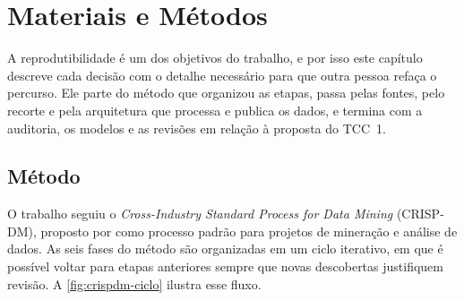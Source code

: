 
\chapter{Materiais e Métodos}
\label{cap:metodologia}

A reprodutibilidade é um dos objetivos do trabalho, e por isso este capítulo descreve cada decisão com o detalhe necessário para que outra pessoa refaça o percurso. Ele parte do método que organizou as etapas, passa pelas fontes, pelo recorte e pela arquitetura que processa e publica os dados, e termina com a auditoria, os modelos e as revisões em relação à proposta do TCC~1.

\section{Método}
\label{sec:metodo}

O trabalho seguiu o \textit{Cross-Industry Standard Process for Data Mining} (CRISP-DM), proposto por  como processo padrão para projetos de mineração e análise de dados. As seis fases do método são organizadas em um ciclo iterativo, em que é possível voltar para etapas anteriores sempre que novas descobertas justifiquem revisão. A \autoref{fig:crispdm-ciclo} ilustra esse fluxo.

